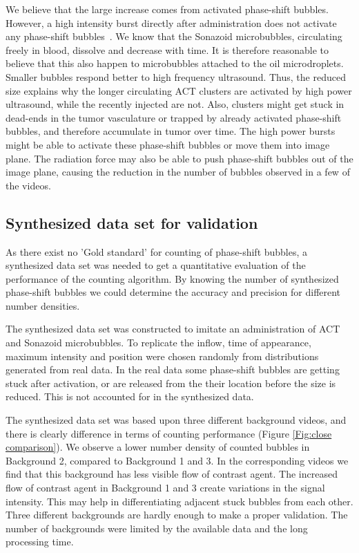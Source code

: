 We believe that the large increase comes from activated phase-shift bubbles. However, a high intensity burst directly after administration does not activate any phase-shift bubbles~\cite{pc_annemieke}. We know that the Sonazoid\texttrademark{} microbubbles, circulating freely in blood, dissolve and decrease with time. It is therefore reasonable to believe that this also happen to microbubbles attached to the oil microdroplets. Smaller bubbles respond better to high frequency ultrasound. Thus, the reduced size explains why the longer circulating ACT\texttrademark{} clusters are activated by high power ultrasound, while the recently injected are not. Also, clusters might get stuck in dead-ends in the tumor vasculature or trapped by already activated phase-shift bubbles, and therefore accumulate in tumor over time. The high power bursts might be able to activate these phase-shift bubbles or move them into image plane. The radiation force may also be able to push phase-shift bubbles out of the image plane, causing the reduction in the number of bubbles observed in a few of the videos.


\subsection{Synthesized data set for validation}
As there exist no 'Gold standard' for counting of phase-shift bubbles, a synthesized data set was needed to get a quantitative evaluation of the performance of the counting algorithm. By knowing the number of synthesized phase-shift bubbles we could determine the accuracy and precision for different number densities.

The synthesized data set was constructed to imitate an administration of ACT\texttrademark{} and Sonazoid\texttrademark{} microbubbles. To replicate the inflow, time of appearance, maximum intensity and position were chosen randomly from distributions generated from real data. In the real data some phase-shift bubbles are getting stuck after activation, or are released from the their location before the size is reduced. This is not accounted for in the synthesized data. 

The synthesized data set was based upon three different background videos, and there is clearly difference in terms of counting performance (Figure \ref{Fig:close comparison}). We observe a lower number density of counted bubbles in Background 2, compared to Background 1 and 3. In the corresponding videos we find that this background has less visible flow of contrast agent. The increased flow of contrast agent in Background 1 and 3 create variations in the signal intensity. This may help in differentiating adjacent stuck bubbles from each other. Three different backgrounds are hardly enough to make a proper validation. The number of backgrounds were limited by the available data and the long processing  time. 


